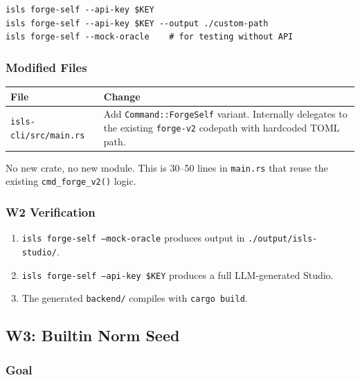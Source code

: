 \documentclass[11pt,a4paper]{article}
\begin{document}
\begin{lstlisting}[style=bash]
isls forge-self --api-key $KEY
isls forge-self --api-key $KEY --output ./custom-path
isls forge-self --mock-oracle    # for testing without API
\end{lstlisting}

\subsubsection{Modified Files}

\begin{longtable}{lp{10cm}}
\toprule
\textbf{File} & \textbf{Change} \\
\midrule
\texttt{isls-cli/src/main.rs}
  & Add \texttt{Command::ForgeSelf} variant. Internally delegates to
    the existing \texttt{forge-v2} codepath with hardcoded TOML path. \\
\bottomrule
\end{longtable}

No new crate, no new module. This is 30--50 lines in \texttt{main.rs}
that reuse the existing \texttt{cmd\_forge\_v2()} logic.

\subsubsection{W2 Verification}

\begin{enumerate}[nosep]
\item \texttt{isls forge-self --mock-oracle} produces output in
      \texttt{./output/isls-studio/}.
\item \texttt{isls forge-self --api-key \$KEY} produces a full
      LLM-generated Studio.
\item The generated \texttt{backend/} compiles with \texttt{cargo build}.
\end{enumerate}


\subsection{W3: Builtin Norm Seed}
\label{sec:w3}

\subsubsection{Goal}
\end{document}
